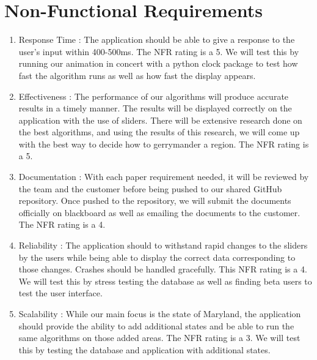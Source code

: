\documentclass{article}
\begin{document}
\vspace{2.5mm}


\section{Non-Functional Requirements}\label{sec:non-functionalReq}

\vspace{2.5mm}

\begin{addmargin}[2em]{0em}
\begin{enumerate}

\item Response Time : The application should be able to give a response to the user's input within 400-500ms. The NFR rating is a 5. We will test this by running our animation in concert with a python clock package to test how fast the algorithm runs as well as how fast the display appears.

\item Effectiveness : The performance of our algorithms will produce accurate results in a timely manner. The results will be displayed correctly on the application with the use of sliders. There will be extensive research done on the best algorithms, and using the results of this research, we will come up with the best way to decide how to gerrymander a region. The NFR rating is a 5.

\item Documentation : With each paper requirement needed, it will be reviewed by the team and the customer before being pushed to our shared GitHub repository. Once pushed to the repository, we will submit the documents officially on blackboard as well as emailing the documents to the customer. The NFR rating is a 4. 

\item Reliability : The application should to withstand rapid changes to the sliders by the users while being able to display the correct data corresponding to those changes. Crashes should be handled gracefully. This NFR rating is a 4. We will test this by stress testing the database as well as finding beta users to test the user interface.

\item Scalability : While our main focus is the state of Maryland, the application should provide the ability to add additional states and be able to run the same algorithms on those added areas. The NFR rating is a 3. We will test this by testing the database and application with additional states.


\end{enumerate}
\end{addmargin}
\end{document}
